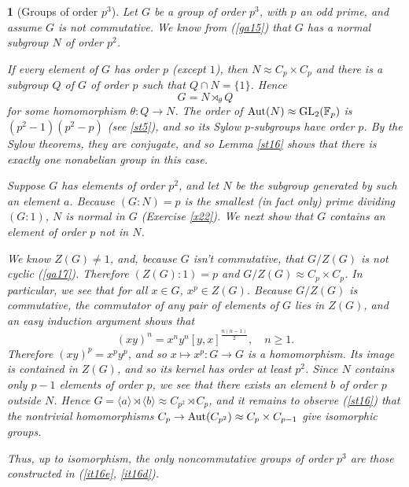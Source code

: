 \documentclass[a4paper,11pt,final,openany]{memoir}%
\newtheorem{plain}[X]{}
\theoremstyle{nonumberplain}
\begin{document}
\begin{plain}
[Groups of order $p^{3}$]\label{st19}%
%
Let $G$ be a group of order $p^{3}$, with $p$ an odd prime, and assume $G$ is
not commutative. We know from (\ref{ga15}) that $G$ has a normal subgroup $N$
of order $p^{2}$.

If every element of $G$ has order $p$ (except $1$), then $N\approx C_{p}\times
C_{p}$ and there is a subgroup $Q$ of $G$ of order $p$ such that $Q\cap
N=\{1\}$. Hence
\[
G=N\rtimes_{\theta}Q
\]
for some homomorphism $\theta\colon Q\rightarrow N$. The order of
$\operatorname{Aut}(N)\approx\operatorname{GL}_{2}(\mathbb{F}{}_{p})$ is $(p^{2}-1)(p^{2}-p)$ (see
\ref{st5}), and so its Sylow $p$-subgroups have order $p$. By the Sylow
theorems, they are conjugate, and so Lemma \ref{st16} shows that there is
exactly one nonabelian group in this case.

Suppose $G$ has elements of order $p^{2}$, and let $N$ be the subgroup
generated by such an element $a$. Because $(G:N)=p$ is the smallest (in fact
only) prime dividing $(G:1)$, $N$ is normal in $G$ (Exercise \ref{x22}). We
next show that $G$ contains an element of order $p$ not in $N$.

We know $Z(G)\neq1$, and, because $G$ isn't commutative, that $G/Z(G)$ is not
cyclic (\ref{ga17}). Therefore $(Z(G):1)=p$ and $G/Z(G)\approx C_{p}\times
C_{p}$. In particular, we see that for all $x\in G$, $x^{p}\in Z(G)$. Because
$G/Z(G)$ is commutative, the commutator of any pair of elements of $G$ lies in
$Z(G)$, and an easy induction argument shows that
\[
(xy)^{n}=x^{n}y^{n}[y,x]^{\frac{n(n-1)}{2}},\quad n\geq1.
\]
Therefore $(xy)^{p}=x^{p}y^{p}$, and so $x\mapsto x^{p}\colon G\rightarrow G$
is a homomorphism. Its image is contained in $Z(G)$, and so its kernel has
order at least $p^{2}$. Since $N$ contains only $p-1$ elements of order $p$,
we see that there exists an element $b$ of order $p$ outside $N$. Hence
$G=\langle a\rangle\rtimes\langle b\rangle\approx C_{p^{2}}\rtimes C_{p}$, and
it remains to observe (\ref{st16}) that the nontrivial homomorphisms
$C_{p}\rightarrow\operatorname{Aut}(C_{p^{2}})\approx C_{p}\times C_{p-1}$ give isomorphic groups.

Thus, up to isomorphism, the only noncommutative groups of order $p^{3}$ are
those constructed in (\ref{it16e}, \ref{it16d}).
\end{plain}
\end{document}
